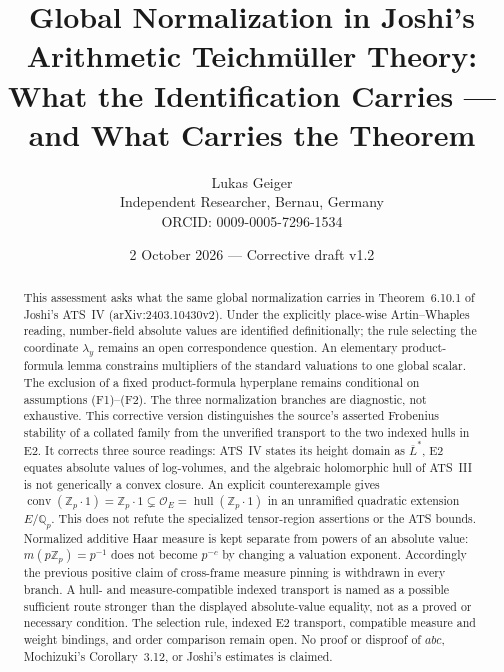 \documentclass[11pt,a4paper]{article}
\title{Global Normalization in Joshi's Arithmetic Teichmüller Theory:\\
What the Identification Carries --- and What Carries the Theorem}
\author{Lukas Geiger\\[2pt]
\small Independent Researcher, Bernau, Germany\\
\small ORCID: 0009-0005-7296-1534}
\date{2 October 2026 --- Corrective draft v1.2}
\theoremstyle{definition}
\theoremstyle{plain}
\theoremstyle{definition}
\begin{document}
\maketitle

\begin{abstract}
\noindent
This assessment asks what the same global normalization carries in
Theorem~6.10.1 of Joshi's ATS~IV (arXiv:2403.10430v2). Under the explicitly
place-wise Artin--Whaples reading, number-field absolute values are identified
definitionally; the rule selecting the coordinate $\lambda_y$ remains an open
correspondence question. An elementary product-formula lemma constrains
multipliers of the standard valuations to one global scalar. The exclusion of a
fixed product-formula hyperplane remains conditional on assumptions (F1)--(F2).
The three normalization branches are diagnostic, not exhaustive.
This corrective version distinguishes the source's asserted Frobenius stability
of a collated family from the unverified transport to the two indexed hulls in E2.
It corrects three source readings: ATS~IV states its height domain as
$\overline L^*$, E2 equates absolute values of log-volumes, and the algebraic
holomorphic hull of ATS~III is not generically a convex closure. An explicit
counterexample gives $\operatorname{conv}(\mathbb Z_p\cdot1)=\mathbb Z_p\cdot1
\subsetneq\mathcal O_E=\operatorname{hull}(\mathbb Z_p\cdot1)$ in an unramified
quadratic extension $E/\mathbb Q_p$. This does not refute the specialized
tensor-region assertions or the ATS bounds. Normalized additive Haar measure is
kept separate from powers of an absolute value: $m(p\mathbb Z_p)=p^{-1}$ does not
become $p^{-c}$ by changing a valuation exponent. Accordingly the previous
positive claim of cross-frame measure pinning is withdrawn in every branch.
A hull- and measure-compatible indexed transport is named as a possible
sufficient route stronger than the displayed absolute-value equality, not as a
proved or necessary condition. The selection rule, indexed E2 transport,
compatible measure and weight bindings, and order comparison remain open.
No proof or disproof of $abc$, Mochizuki's Corollary~3.12, or Joshi's estimates
is claimed.
\end{abstract}
\end{document}
